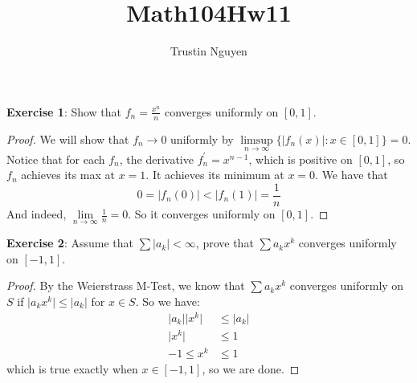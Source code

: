 \documentclass{article}
\title{Math104Hw11}
\author{Trustin Nguyen}
\begin{document}
    \maketitle

\reversemarginpar

\textbf{Exercise 1}: Show that $f_{n} = \frac{x^{n}}{n}$ converges uniformly on $[0, 1]$.
    \begin{proof}
        We will show that $f_{n} \rightarrow 0$ uniformly by $\limsup\limits_{n \to \infty}  \{\lvert f_{n}(x) \rvert : x \in [0, 1]\} = 0$. Notice that for each $f_{n}$, the derivative $f^{\prime}_{n} = x^{n - 1}$, which is positive on $[0, 1]$, so $f_{n}$ achieves its max at $x = 1$. It achieves its minimum at $x = 0$. We have that
            \begin{equation*}
                0 = \lvert f_{n}(0) \rvert < \lvert f_{n}(1) \rvert = \dfrac{1}{n}
            \end{equation*}
        And indeed, $\lim\limits_{n \to \infty} \frac{1}{n} = 0$. So it converges uniformly on $[0, 1]$.
    \end{proof}

\textbf{Exercise 2}: Assume that $\sum \lvert a_{k} \rvert < \infty$, prove that $\sum a_{k}x^{k}$ converges uniformly on $[-1, 1]$.
    \begin{proof}
        By the Weierstrass M-Test, we know that $\sum a_{k}x^{k}$ converges uniformly on $S$ if $\lvert a_{k}x^{k} \rvert \leq \lvert a_{k} \rvert$ for $x \in S$. So we have:
             \begin{align*}
                 \lvert a_{k} \rvert \lvert x^{k} \rvert &\leq \lvert a_{k} \rvert \\
                                     \lvert x^{k} \rvert &\leq 1 \\
                                           -1 \leq x^{k} &\leq 1
             \end{align*}
        which is true exactly when $x \in [-1, 1]$, so we are done.
    \end{proof}
\end{document}
